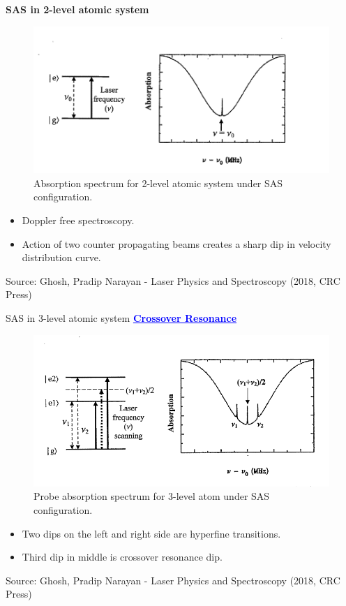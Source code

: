 \documentclass[9pt,aspectratio94]{beamer}
\begin{document}
\begin{frame}{\textbf {SAS in 2-level atomic system}}
\begin{figure}
     \centering
     \includegraphics[scale=0.4]{SAS twolevel.png}
     \caption{Absorption spectrum for 2-level atomic system under SAS configuration.}
     \label{fig:figure 3}
 \end{figure}
 \begin{itemize}
\item Doppler free spectroscopy.
 \item Action of two counter propagating beams creates a sharp dip in velocity distribution curve.
 \end{itemize}
 \tiny{Source: Ghosh, Pradip Narayan - Laser Physics and Spectroscopy (2018, CRC Press)}
\end{frame}

\begin{frame}{SAS in 3-level atomic system }
\centering
\textcolor{blue}{\underline{\textbf{Crossover Resonance}}}
\begin{figure}
    \centering
    \includegraphics[scale=0.4]{SAS threelevel.png}
    \caption{Probe absorption spectrum for 3-level atom under SAS configuration.}
    \label{fig:enter-label}
\end{figure}
\begin{itemize}
   \item Two dips on the left and right side are hyperfine transitions.
   \item Third dip in middle is crossover resonance dip.
  \end{itemize}
\tiny{Source: Ghosh, Pradip Narayan - Laser Physics and Spectroscopy (2018, CRC Press)} 
\end{frame}
\end{document}
